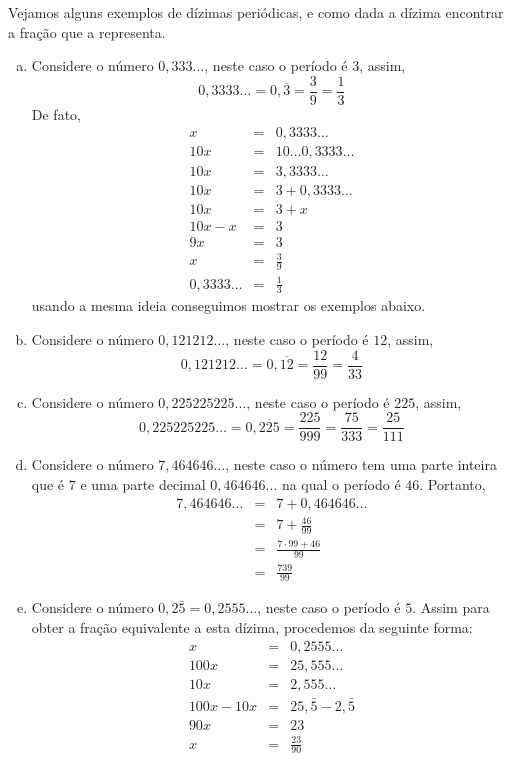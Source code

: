  \begin{exem} Vejamos alguns exemplos de dízimas periódicas, e como dada a dízima encontrar a fração que a representa.

  \begin{enumerate}[a)]
   \item Considere o número $0,333 \ldots$, neste caso o período é $3$, assim,
   \[0,3333 \ldots= 0,\overline{3}= \frac{3}{9}= \frac{1}{3}\]
   De fato,
   \begin{eqnarray*}
    x &=& 0,3333 \ldots \\
    10x &=& 10 \ldots 0,3333 \ldots \\
    10x &=& 3,3333 \ldots \\
    10x &=& 3 + 0,3333 \ldots \\
    10x &=& 3 + x \\
    10x - x &=& 3 \\
    9x &=& 3 \\
    x &=& \frac{3}{9} \\
    0,3333 \ldots &=& \frac{1}{3}
   \end{eqnarray*}
   usando a mesma ideia conseguimos mostrar os exemplos abaixo.

   \item Considere o número $0,121212 \ldots$, neste caso o período é $12$, assim,
   \[0,121212 \ldots= 0,\overline{12}= \frac{12}{99}= \frac{4}{33}\]
   
   \item Considere o número $0,225225225 \ldots$, neste caso o período é $225$, assim,
   \[0,225225225 \ldots= 0,\overline{225}= \frac{225}{999}= \frac{75}{333}=\frac{25}{111}\]
   
   \item Considere o número $7,464646 \ldots$, neste caso o número tem uma parte inteira que é $7$ e uma parte decimal $0,464646 \ldots$ na qual o período é $46$. Portanto,
   \begin{eqnarray*}
    7,464646 \ldots &=& 7+0,464646 \ldots \\
    &=& 7 + \frac{46}{99} \\
    &=& \frac{7\cdot 99 + 46}{99}\\
    &=& \frac{739}{99}
   \end{eqnarray*}
   
   \item Considere o número $0,2\bar{5}= 0,2555 \ldots$, neste caso o período é $5$. Assim para obter a fração equivalente a esta dízima, procedemos da seguinte forma:
   \begin{eqnarray*}
    x &=& 0,2555 \ldots \\
    100x &=& 25,555 \ldots \\
    10x &=& 2,555 \ldots \\
    100x - 10x &=& 25,\bar{5} - 2, \bar{5} \\
    90x &=& 23 \\
    x&=& \frac{23}{90}    
   \end{eqnarray*}
   

\end{enumerate}
\end{exem}
